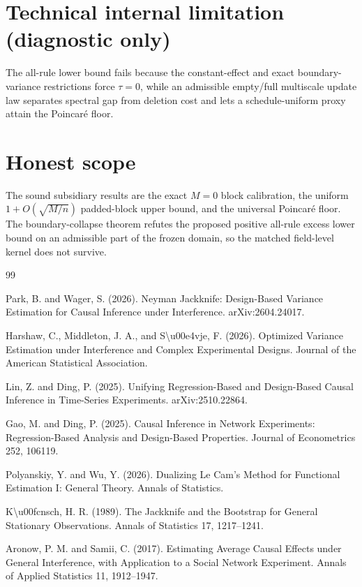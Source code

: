 \documentclass{article}
\begin{document}
\section*{Technical internal limitation (diagnostic only)}

The all-rule lower bound fails because the constant-effect and exact boundary-variance restrictions force \(\tau=0\), while an admissible empty/full multiscale update law separates spectral gap from deletion cost and lets a schedule-uniform proxy attain the Poincar\'e floor.

\section{Honest scope}

The sound subsidiary results are the exact \(M=0\) block calibration, the uniform \(1+O(\sqrt{M/n})\) padded-block upper bound, and the universal Poincar\'e floor. The boundary-collapse theorem refutes the proposed positive all-rule excess lower bound on an admissible part of the frozen domain, so the matched field-level kernel does not survive.

\begin{thebibliography}{99}

   Park, B. and Wager, S. (2026). Neyman Jackknife: Design-Based Variance Estimation for Causal Inference under Interference. arXiv:2604.24017.

   Harshaw, C., Middleton, J. A., and S\textbackslash{}u00e4vje, F. (2026). Optimized Variance Estimation under Interference and Complex Experimental Designs. Journal of the American Statistical Association.

   Lin, Z. and Ding, P. (2025). Unifying Regression-Based and Design-Based Causal Inference in Time-Series Experiments. arXiv:2510.22864.

   Gao, M. and Ding, P. (2025). Causal Inference in Network Experiments: Regression-Based Analysis and Design-Based Properties. Journal of Econometrics 252, 106119.

   Polyanskiy, Y. and Wu, Y. (2026). Dualizing Le Cam's Method for Functional Estimation I: General Theory. Annals of Statistics.

   K\textbackslash{}u00fcnsch, H. R. (1989). The Jackknife and the Bootstrap for General Stationary Observations. Annals of Statistics 17, 1217--1241.

   Aronow, P. M. and Samii, C. (2017). Estimating Average Causal Effects under General Interference, with Application to a Social Network Experiment. Annals of Applied Statistics 11, 1912--1947.

\end{thebibliography}
\end{document}
